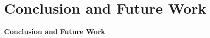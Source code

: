 \documentclass[10pt,aspectratio=169,english]{beamer}
\begin{document}
%				
%				
%				
%				
%				
%				
%				
%				
%				
%				

\section{Conclusion and Future Work}


\begin{frame}{}
	\textbf{\huge Conclusion and Future Work}
\end{frame}
\end{document}

